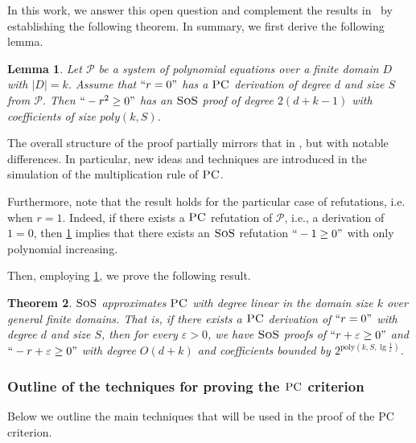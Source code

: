 \documentclass[11pt]{article}
\newcommand{\sos}{\text{\sc{SoS}}}
\newcommand{\PC}{\textsc{PC}}
\newcommand{\1}{\textbf{1}}
\newtheorem{theorem}{Theorem}[section]
\newtheorem{lemma}[theorem]{Lemma}
\begin{document}
In this work, we answer this open question and complement the results in~\cite{GrigorievV01,berkholz18} by establishing the following theorem. In summary, we first derive the following lemma.

\begin{lemma}\label{th:sos_sim_PC_introduction}
    Let $\mathcal{P}$ be a system of polynomial equations over a finite domain $D$ with $|D| = k$. Assume that $``r=0"$ has a $\PC$ derivation of degree $d$ and size $S$ from $\mathcal{P}$. Then $`` -r^2\geq 0"$ has an $\sos$ proof of degree $2(d+k-1)$ with coefficients of size $poly(k,S)$.
\end{lemma}

The overall structure of the proof partially mirrors that in \cite{berkholz18}, but with notable differences. In particular, new ideas and techniques are introduced in the simulation of the multiplication rule of \(\PC\).

Furthermore, note that the result holds for the particular case of refutations, i.e. when $r=1$. Indeed, if there exists a $\PC$ refutation of $\mathcal{P}$, i.e., a derivation of $1=0$, then \cref{th:sos_sim_PC_introduction} implies that there exists an $\sos$ refutation $``-1 \geq 0"$ with only polynomial increasing.

Then, employing \cref{th:sos_sim_PC_introduction}, we prove the following result.

\begin{theorem}\label{th:sospc_introduction}
    $\sos$ \emph{approximates} $\PC$ with degree linear in the domain size $k$ over general finite domains. That is, if there exists a \(\PC\) derivation of \( ``r=0" \) with degree \( d \) and size \( S \), then for every \( \varepsilon > 0 \), we have \(\sos\) proofs of \( ``r+\varepsilon \geq 0" \) and \( ``-r+\varepsilon \geq 0" \) with degree \( O(d+k) \) and coefficients bounded by \( 2^{\text{poly}(k, S, \lg \frac{1}{\varepsilon})} \).
\end{theorem}


\subsubsection*{Outline of the techniques for proving the $\PC$ criterion}\label{sect:outline_PC_proof}

Below we outline the main techniques that will be used in the proof of the PC criterion. 
\end{document}
